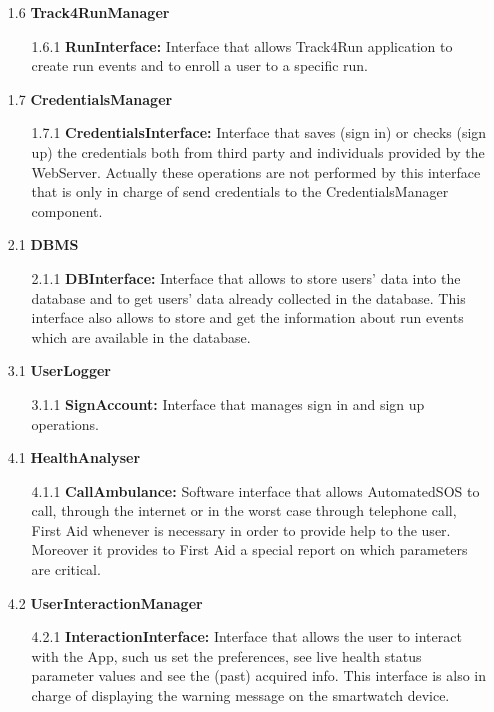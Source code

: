 \begin{center}
\begin{enumerate}
\item[1.6] \textbf{Track4RunManager}
	\begin{enumerate}[nolistsep]
		\item[1.6.1] \textbf{RunInterface:} Interface that allows Track4Run application to create run events and to enroll a user to a specific run. 
	\end{enumerate}
	
\item[1.7] \textbf{CredentialsManager}
	\begin{enumerate}[nolistsep]
		\item[1.7.1] \textbf{CredentialsInterface:} Interface that saves (sign in) or checks (sign up) the credentials both from third party and individuals provided by the WebServer. Actually these operations are not performed by this interface that is only in charge of send credentials to the CredentialsManager component.
	\end{enumerate}

\item[2.1] \textbf{DBMS}
	\begin{enumerate}[nolistsep]
		\item[2.1.1] \textbf{DBInterface:} Interface that allows to store users' data into the database and to get users' data already collected in the database. This interface also allows to store and get the information about run events which are available in the database.
	\end{enumerate}
	
\item[3.1] \textbf{UserLogger}
	\begin{enumerate}[nolistsep]
		\item[3.1.1] \textbf{SignAccount:} Interface that manages sign in and sign up operations.
	\end{enumerate}
	
\item[4.1] \textbf{HealthAnalyser}
	\begin{enumerate}[nolistsep]
		\item[4.1.1] \textbf{CallAmbulance:} Software interface that allows AutomatedSOS to call, through the internet or in the worst case through telephone call, First Aid whenever is necessary in order to provide help to the user. Moreover it provides to First Aid a special report on which parameters are critical.	
	\end{enumerate}
\item[4.2] \textbf{UserInteractionManager}
	\begin{enumerate}[nolistsep]
		\item[4.2.1] \textbf{InteractionInterface:} Interface that allows the user to interact with the App, such us set the preferences, see live health status parameter values and see the (past) acquired info. This interface is also in charge of displaying the warning message on the smartwatch device.
	\end{enumerate}	
	

\end{enumerate}
\end{center}

